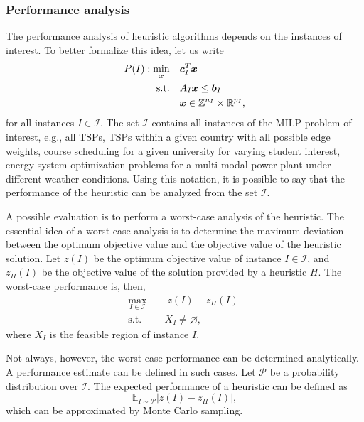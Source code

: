 \subsubsection{Performance analysis}

The performance analysis of heuristic algorithms depends on the instances of interest.
To better formalize this idea, let us write
\begin{align*}
    P(I): \min_{\bm{x}} \quad & \bm{c}_I^{T}\bm{x} \\
    \textrm{s.t.} \quad & A_I\bm{x} \le \bm{b}_I \\
      & \bm{x}\in \mathbb{Z}^{n_I}\times \mathbb{R}^{p_I}
,\end{align*}
for all instances $I\in \mathcal{I}$.
The set $\mathcal{I}$ contains all instances of the MILP problem of interest, e.g., all TSPs, TSPs within a given country with all possible edge weights, course scheduling for a given university for varying student interest, energy system optimization problems for a multi-modal power plant under different weather conditions.
Using this notation, it is possible to say that the performance of the heuristic can be analyzed from the set $\mathcal{I}$.

A possible evaluation is to perform a worst-case analysis of the heuristic.
The essential idea of a worst-case analysis is to determine the maximum deviation between the optimum objective value and the objective value of the heuristic solution. 
Let $z(I)$ be the optimum objective value of instance $I\in \mathcal{I}$, and $z_H(I)$ be the objective value of the solution provided by a heuristic $H$.
The worst-case performance is, then,
\begin{equation}
    \begin{split}
	\max_{I\in \mathcal{I}} \quad& |z(I) - z_H(I)| \\
	\textrm{s.t.} \quad& X_I \neq \varnothing
    ,\end{split}
\end{equation}
where $X_I$ is the feasible region of instance $I$.

Not always, however, the worst-case performance can be determined analytically.
A performance estimate can be defined in such cases.
Let $\mathcal{P}$ be a probability distribution over $\mathcal{I}$.
The expected performance of a heuristic can be defined as \[
    \mathbb{E}_{I\sim \mathcal{P}} |z(I) - z_H(I)|
,\] which can be approximated by Monte Carlo sampling.



